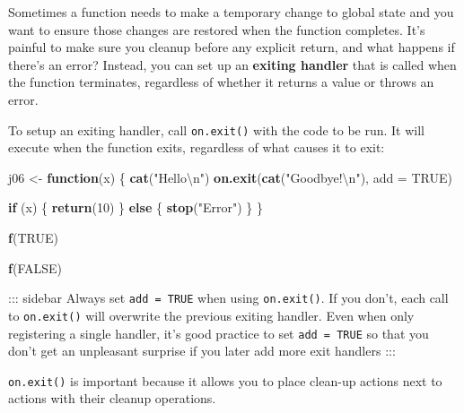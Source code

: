 \documentclass[]{book}
\newenvironment{Shaded}{\begin{snugshade}}{\end{snugshade}}
\newcommand{\KeywordTok}[1]{\textcolor[rgb]{0.13,0.29,0.53}{\textbf{#1}}}
\newcommand{\DataTypeTok}[1]{\textcolor[rgb]{0.13,0.29,0.53}{#1}}
\newcommand{\DecValTok}[1]{\textcolor[rgb]{0.00,0.00,0.81}{#1}}
\newcommand{\CharTok}[1]{\textcolor[rgb]{0.31,0.60,0.02}{#1}}
\newcommand{\StringTok}[1]{\textcolor[rgb]{0.31,0.60,0.02}{#1}}
\newcommand{\OtherTok}[1]{\textcolor[rgb]{0.56,0.35,0.01}{#1}}
\newcommand{\ControlFlowTok}[1]{\textcolor[rgb]{0.13,0.29,0.53}{\textbf{#1}}}
\newcommand{\NormalTok}[1]{#1}
\theoremstyle{definition}
\theoremstyle{definition}
\theoremstyle{definition}
\theoremstyle{remark}
\begin{document}
Sometimes a function needs to make a temporary change to global state
and you want to ensure those changes are restored when the function
completes. It's painful to make sure you cleanup before any explicit
return, and what happens if there's an error? Instead, you can set up an
\textbf{exiting handler} that is called when the function terminates,
regardless of whether it returns a value or throws an error.

To setup an exiting handler, call \texttt{on.exit()} with the code to be
run. It will execute when the function exits, regardless of what causes
it to exit:

\begin{Shaded}
\begin{Highlighting}[]
\NormalTok{j06 <-}\StringTok{ }\ControlFlowTok{function}\NormalTok{(x) \{}
  \KeywordTok{cat}\NormalTok{(}\StringTok{"Hello}\CharTok{\textbackslash{}n}\StringTok{"}\NormalTok{)}
  \KeywordTok{on.exit}\NormalTok{(}\KeywordTok{cat}\NormalTok{(}\StringTok{"Goodbye!}\CharTok{\textbackslash{}n}\StringTok{"}\NormalTok{), }\DataTypeTok{add =} \OtherTok{TRUE}\NormalTok{)}
  
  \ControlFlowTok{if}\NormalTok{ (x) \{}
    \KeywordTok{return}\NormalTok{(}\DecValTok{10}\NormalTok{)}
\NormalTok{  \} }\ControlFlowTok{else}\NormalTok{ \{}
    \KeywordTok{stop}\NormalTok{(}\StringTok{"Error"}\NormalTok{)}
\NormalTok{  \}}
\NormalTok{\}}

\KeywordTok{f}\NormalTok{(}\OtherTok{TRUE}\NormalTok{)}
\end{Highlighting}
\end{Shaded}

\begin{Shaded}
\begin{Highlighting}[]
\KeywordTok{f}\NormalTok{(}\OtherTok{FALSE}\NormalTok{)}
\end{Highlighting}
\end{Shaded}

::: sidebar Always set \texttt{add\ =\ TRUE} when using
\texttt{on.exit()}. If you don't, each call to \texttt{on.exit()} will
overwrite the previous exiting handler. Even when only registering a
single handler, it's good practice to set \texttt{add\ =\ TRUE} so that
you don't get an unpleasant surprise if you later add more exit handlers
:::

\texttt{on.exit()} is important because it allows you to place clean-up
actions next to actions with their cleanup operations.
\end{document}
